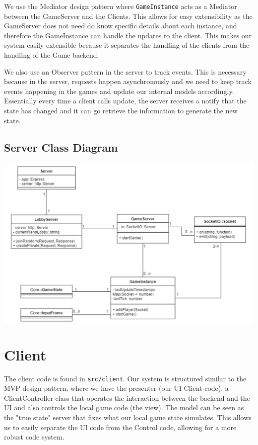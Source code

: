 \documentclass[12pt]{report}
\begin{document}
We use the Mediator design pattern where \texttt{GameInstance} acts as a Mediator between the GameServer and the Clients. This allows for easy extensibility as the GameServer does not need do know specific details about each instance, and therefore the GameInstance can handle the updates to the client. This makes our system easily extensible because it separates the handling of the clients from the handling of the Game backend. 

We also use an Observer pattern in the server to track events. This is necessary because in the server, requests happen asynchronously and we need to keep track events happening in the games and update our internal models accordingly. Essentially every time a client calls update, the server receives a notify that the state has changed and it can go retrieve the information to generate the new state. 

\subsection{Server Class Diagram}
\includegraphics[width=\linewidth]{images/server_classes.png}

\section{Client}

The client code is found in \texttt{src/client}. Our system is structured similar to the MVP design pattern, where we have the presenter (our UI Client code), a ClientController class that operates the interaction between the backend and the UI and also controls the local game code (the view). The model can be seen as the "true state" server that fixes what our local game state simulates. This allows us to easily separate the UI code from the Control code, allowing for a more robust code system. 
\end{document}
